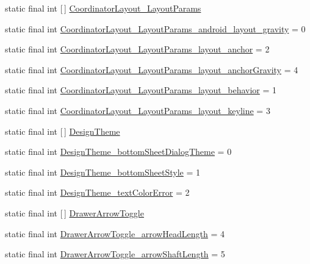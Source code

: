 \begin{DoxyCompactItemize}
\item 
static final int \mbox{[}$\,$\mbox{]} \hyperlink{classproject4_1_1xaria_1_1R_1_1styleable_ad7c97c688ef4dae4ebe89418a84dab5d}{Coordinator\+Layout\+\_\+\+Layout\+Params}
\item 
static final int \hyperlink{classproject4_1_1xaria_1_1R_1_1styleable_aa0d36210c51f5ae4879714ecc8f3fdbd}{Coordinator\+Layout\+\_\+\+Layout\+Params\+\_\+android\+\_\+layout\+\_\+gravity} = 0
\item 
static final int \hyperlink{classproject4_1_1xaria_1_1R_1_1styleable_acd12b16f8a05e1b4ae6a327d285ff2e0}{Coordinator\+Layout\+\_\+\+Layout\+Params\+\_\+layout\+\_\+anchor} = 2
\item 
static final int \hyperlink{classproject4_1_1xaria_1_1R_1_1styleable_a925c4c2bfdf0e1acd8bbc979d2aec36a}{Coordinator\+Layout\+\_\+\+Layout\+Params\+\_\+layout\+\_\+anchor\+Gravity} = 4
\item 
static final int \hyperlink{classproject4_1_1xaria_1_1R_1_1styleable_a606d268587159d1993a3fa9bfaa507e2}{Coordinator\+Layout\+\_\+\+Layout\+Params\+\_\+layout\+\_\+behavior} = 1
\item 
static final int \hyperlink{classproject4_1_1xaria_1_1R_1_1styleable_a9e5e38d49198f35609d9b905af511517}{Coordinator\+Layout\+\_\+\+Layout\+Params\+\_\+layout\+\_\+keyline} = 3
\item 
static final int \mbox{[}$\,$\mbox{]} \hyperlink{classproject4_1_1xaria_1_1R_1_1styleable_a190554b7e28f27d85d823a1301dd3cf5}{Design\+Theme}
\item 
static final int \hyperlink{classproject4_1_1xaria_1_1R_1_1styleable_aba996d6e1ec660c5b7390497dc2c2359}{Design\+Theme\+\_\+bottom\+Sheet\+Dialog\+Theme} = 0
\item 
static final int \hyperlink{classproject4_1_1xaria_1_1R_1_1styleable_abc176fafc34aad2467941c85f699cb37}{Design\+Theme\+\_\+bottom\+Sheet\+Style} = 1
\item 
static final int \hyperlink{classproject4_1_1xaria_1_1R_1_1styleable_ae4d0323b8c38346ddb8722e9bf22d47f}{Design\+Theme\+\_\+text\+Color\+Error} = 2
\item 
static final int \mbox{[}$\,$\mbox{]} \hyperlink{classproject4_1_1xaria_1_1R_1_1styleable_aa8594da8de0b2617c3d5cd5e028f8b77}{Drawer\+Arrow\+Toggle}
\item 
static final int \hyperlink{classproject4_1_1xaria_1_1R_1_1styleable_a457594739477bbef860905dc8962ed87}{Drawer\+Arrow\+Toggle\+\_\+arrow\+Head\+Length} = 4
\item 
static final int \hyperlink{classproject4_1_1xaria_1_1R_1_1styleable_a49fc6620d696930dca13977825e4fc11}{Drawer\+Arrow\+Toggle\+\_\+arrow\+Shaft\+Length} = 5

\end{DoxyCompactItemize}
